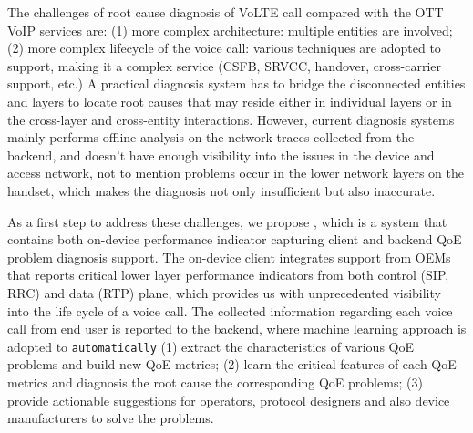 The challenges of root cause diagnosis of VoLTE call compared with the OTT VoIP services are: (1) more complex architecture: multiple entities are involved; (2) more complex lifecycle of the voice call: various techniques are adopted to support, making it a complex service (CSFB, SRVCC, handover, cross-carrier support, etc.) A practical diagnosis system has to bridge the disconnected entities and layers to locate root causes that may reside either in individual layers or in the cross-layer and cross-entity interactions. However, current diagnosis systems~\cite{jiang2016improving} mainly performs offline analysis on the network traces collected from the backend, and doesn't have enough visibility into the issues in the device and access network, not to mention problems occur in the lower network layers on the handset, which makes the diagnosis not only insufficient but also inaccurate. 

As a first step to address these challenges, we propose \name, which is a system that contains both on-device performance indicator capturing client and backend QoE problem diagnosis support. The on-device client integrates support from OEMs that reports critical lower layer performance indicators from both control (SIP, RRC) and data (RTP) plane, which provides us with unprecedented visibility into the life cycle of a voice call. The collected information regarding each voice call from end user is reported to the backend, where machine learning approach is adopted to \texttt{automatically} (1) extract the characteristics of various QoE problems and build new QoE metrics; (2) learn the critical features of each QoE metrics and diagnosis the root cause the corresponding QoE problems; (3) provide actionable suggestions for operators, protocol designers and also device manufacturers to solve the problems. 







